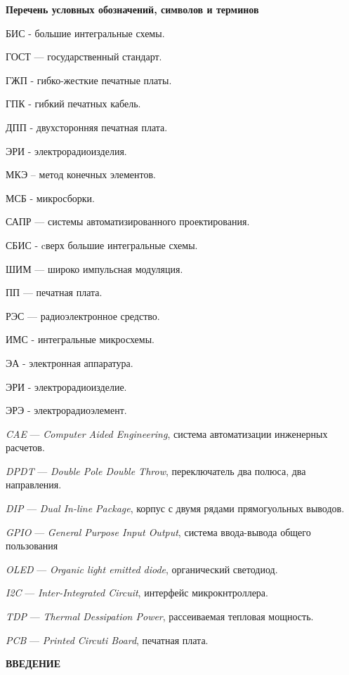
\tableofcontents
\newpage
\begin{center}
\textbf{Перечень условных обозначений, символов и терминов}
\end{center}

БИС - большие интегральные схемы.

ГОСТ — государственный стандарт.

ГЖП - гибко-жесткие печатные платы.

ГПК - гибкий печатных кабель.

ДПП - двухсторонняя печатная плата.

ЭРИ - электрорадиоизделия.

МКЭ – метод конечных элементов.

МСБ - микросборки.

САПР — системы автоматизированного проектирования.

СБИС - cверх большие интегральные схемы.

ШИМ — широко импульсная модуляция.

ПП — печатная плата.

РЭС — радиоэлектронное средство.

ИМС - интегральные микросхемы.

ЭА - электронная аппаратура.

ЭРИ - электрорадиоизделие.

ЭРЭ - электрорадиоэлемент.

\textit{CAE} — \textit{Computer Aided Engineering}, система автоматизации инженерных расчетов.

\textit{DPDT} — \textit{Double Pole Double Throw}, переключатель два полюса, два направления.

\textit{DIP} — \textit{Dual In-line Package}, корпус с двумя рядами
прямогуольных выводов.

\textit{GPIO} — \textit{ General Purpose Input Output}, система ввода-вывода общего пользования

\textit{OLED} — \textit{Organic light emitted diode}, органический светодиод.

\textit{I2C} — \textit{Inter-Integrated Circuit}, интерфейс микрокнтроллера.

\textit{TDP} — \textit{Thermal Dessipation Power}, рассеиваемая тепловая мощность.

\textit{PCB} — \textit{Printed Circuti Board}, печатная плата.

\newpage

\begin{center}
\textbf{ВВЕДЕНИЕ}
\end{center}

